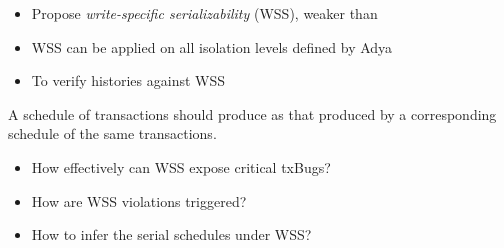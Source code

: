 
\begin{frame}{}
	\begin{center}

		\vspace{0.30cm}
		\begin{itemize}
			\item Propose \emph{write-specific serializability} (WSS), weaker than \ser
			\item WSS can be applied on all isolation levels defined by Adya
			\item To verify histories against WSS
		\end{itemize}
	\end{center}
\end{frame}

\begin{frame}{}
\end{frame}

\begin{frame}{}
	\begin{definition}
		A schedule of  transactions
		should produce 
		as that produced by a corresponding  schedule
		of the same transactions.
	\end{definition}

	\pause
	\vspace{0.30cm}
	\begin{itemize}
		\item How effectively can WSS expose critical txBugs?
		\item How are WSS violations triggered?
		\item How to infer the serial schedules under WSS?
	\end{itemize}
\end{frame}

\begin{frame}{}
\end{frame}

